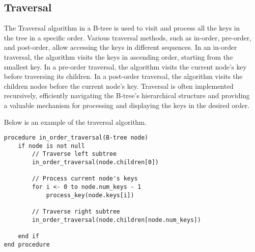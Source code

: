 \subsection*{Traversal}

The Traversal algorithm in a B-tree is used to visit and process all the keys in the tree in a specific order. Various traversal methods, such as in-order, pre-order, and post-order, allow 
accessing the keys in different sequences. In an in-order traversal, the algorithm visits the keys in ascending order, starting from the smallest key. In a pre-order traversal, the algorithm 
visits the current node's key before traversing its children. In a post-order traversal, the algorithm visits the children nodes before the current node's key. Traversal is often implemented 
recursively, efficiently navigating the B-tree's hierarchical structure and providing a valuable mechanism for processing and displaying the keys in the desired order.

\begin{highlight}

Below is an example of the traversal algorithm.

\horizontalline

\begin{verbatim}
procedure in_order_traversal(B-tree node)
    if node is not null
        // Traverse left subtree
        in_order_traversal(node.children[0])

        // Process current node's keys
        for i <- 0 to node.num_keys - 1
            process_key(node.keys[i])

        // Traverse right subtree
        in_order_traversal(node.children[node.num_keys])

    end if
end procedure
\end{verbatim}
    
\end{highlight}